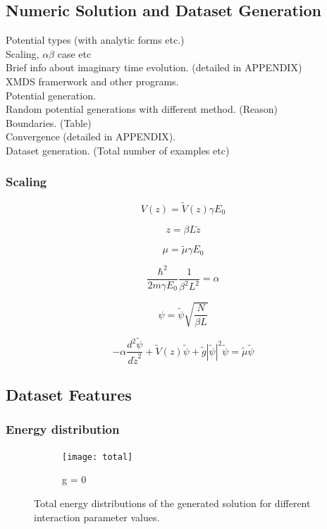 \documentclass[a4paper,times,12pt]{article}
\begin{document}
\subsection{Numeric Solution and Dataset Generation}
\noindent 
Potential types (with analytic forms etc.)\\ 
Scaling, $\alpha \beta$ case etc \\
Brief info about imaginary time evolution. (detailed in APPENDIX)\\
XMDS framerwork and other programs.\\
Potential generation.\\
Random potential generations with different method. (Reason)\\ 
Boundaries. (Table)\\
Convergence (detailed in APPENDIX).\\
Dataset generation. (Total number of examples etc)\\    

\subsubsection{Scaling}

$$ V(z) = \widetilde{V}(z)\gamma E_0 $$

$$z = \beta L\widetilde{z}$$

$$\mu =  \widetilde{\mu}\gamma E_0$$

$$ \frac{\hbar^2}{2m\gamma E_0} \frac{1}{\beta^2 L^2} = \alpha $$

$$ \psi = \widetilde{\psi}\sqrt{\frac{N}{\beta L}}  $$


\begin{equation}
    \label{eq:GPE_dimensionless}
    -\alpha\frac{d^2\widetilde{\psi}}{d\widetilde{z}^2} + \widetilde{V}(z)\widetilde{\psi} + \widetilde{g}|\widetilde{\psi}|^2 \widetilde{\psi} = \widetilde{\mu} \widetilde{\psi}
\end{equation}
    
\subsection{Dataset Features}
\subsubsection{Energy distribution}

\graphicspath{{"../figs/dataresults/gaussian/"}}
\begin{figure}[H]
    \centering
    \begin{subfigure}[t]{0.45\textwidth}
        \texttt{[image: total]}
        \caption{g = 0}
		\label{fig:a}
    \end{subfigure}
    \caption{Total energy distributions of the generated solution for different interaction parameter values.}
\label{fig:energy_dist}
\end{figure}
\end{document}
